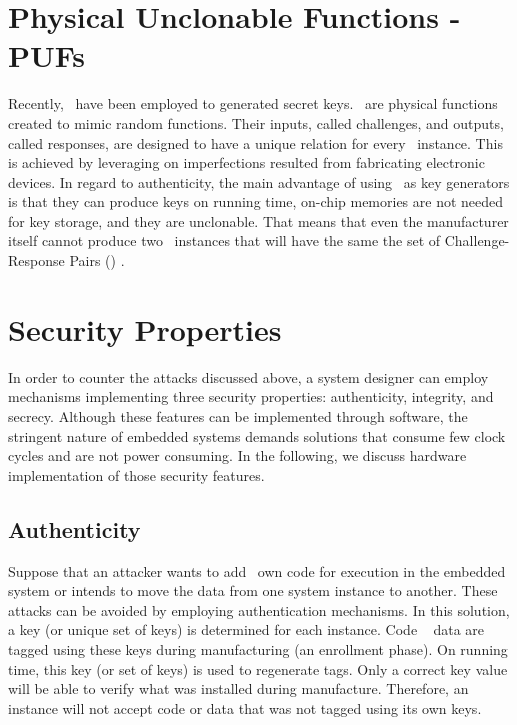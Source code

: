 
\section{Physical Unclonable Functions - PUFs}
\label{sec:pufs}
Recently, \pufs~have been employed to generated secret keys. \pufs~are physical functions created to mimic random functions. Their inputs, called challenges, and outputs, called responses, are designed to have a unique relation for every \puf~instance. This is achieved by leveraging on imperfections resulted from fabricating electronic devices. In regard to authenticity, the main advantage of using \pufs~as key generators is that they can produce keys on running time, on-chip memories are not needed for key storage, and they are unclonable. That means that even the manufacturer itself cannot produce two \puf~instances that will have the same the set of Challenge-Response Pairs (\crps) \cite{Gassend2002:PUFs}.

\section{Security Properties}
\label{sec:Security-Features}

In order to counter the attacks discussed above, a system designer can employ mechanisms implementing three security properties: authenticity, integrity, and secrecy. Although these features can be implemented through software, the stringent nature of embedded systems demands solutions that consume few clock cycles and are not power consuming.
In the following, we discuss hardware implementation of those security features.

\subsection{Authenticity}
\label{subsec:Authenticity}

Suppose that an attacker wants to add \hisher~own code for execution in the embedded system or intends to move the data from one system instance to another. These attacks can be avoided by employing authentication mechanisms. In this solution, a key (or unique set of keys) is determined for each instance. Code \andor~ data are tagged using these keys during manufacturing (an enrollment phase). On running time, this key (or set of keys) is used to regenerate tags. Only a correct key value will be able to verify what was installed during manufacture. Therefore, an instance will not accept code or data that was not tagged using its own keys.

